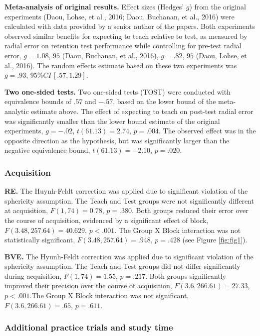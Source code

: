 \documentclass[
  english,
  man,floatsintext]{apa7}
\begin{document}
\textbf{Meta-analysis of original results.} Effect sizes (Hedges' \(g\)) from the original experiments (Daou, Lohse, et al., 2016; Daou, Buchanan, et al., 2016) were calculated with data provided by a senior author of the papers. Both experiments observed similar benefits for expecting to teach relative to test, as measured by radial error on retention test performance while controlling for pre-test radial error, \(g = 1.08\), \(95%
\) (Daou, Buchanan, et al., 2016), \(g = .82\), \(95%
\) (Daou, Lohse, et al., 2016). The random effects estimate based on these two experiments was \(g = .93\), \(95\%CI \,[.57, 1.29]\).

\textbf{Two one-sided tests.} Two one-sided tests (TOST) were conducted with equivalence bounds of \(.57\) and \(-.57\), based on the lower bound of the meta-analytic estimate above. The effect of expecting to teach on post-test radial error was significantly smaller than the lower bound estimate of the original experiments, \(g = -.02\), \(t(61.13) = 2.74\), \(p = .004\). The observed effect was in the opposite direction as the hypothesis, but was significantly larger than the negative equivalence bound, \(t(61.13) = -2.10\), \(p = .020\).

\hypertarget{acquisition}{%
\subsubsection{Acquisition}\label{acquisition}}

\textbf{RE.} The Huynh-Feldt correction was applied due to significant violation of the sphericity assumption. The Teach and Test groups were not significantly different at acquisition, \(F(1,74) = 0.78\), \(p = .380\). Both groups reduced their error over the course of acquisition, evidenced by a significant effect of block, \(F(3.48, 257.64) = 40.629\), \(p < .001\). The Group X Block interaction was not statistically significant, \(F(3.48, 257.64) = .948\), \(p =.428\) (see Figure \ref{fig:fig1}).

\textbf{BVE.} The Hyunh-Feldt correction was applied due to significant violation of the sphericity assumption. The Teach and Test groups did not differ significantly during acquisition, \(F(1,74) = 1.55\), \(p = .217\). Both groups significantly improved their precision over the course of acquisition, \(F(3.6, 266.61) = 27.33\), \(p < .001\).The Group X Block interaction was not significant, \(F(3.6, 266.61) = .65\), \(p = .611\).

\hypertarget{additional-practice-trials-and-study-time}{%
\subsubsection{Additional practice trials and study time}\label{additional-practice-trials-and-study-time}}
\end{document}
